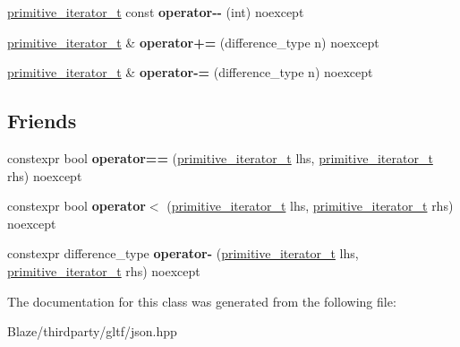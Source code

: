 \begin{DoxyCompactItemize}
\hyperlink{classnlohmann_1_1detail_1_1primitive__iterator__t}{primitive\+\_\+iterator\+\_\+t} const {\bfseries operator-\/-\/} (int) noexcept
\item 
\mbox{\label{classnlohmann_1_1detail_1_1primitive__iterator__t_aee01535df0b3b40137d9241029a9a203}} 
\hyperlink{classnlohmann_1_1detail_1_1primitive__iterator__t}{primitive\+\_\+iterator\+\_\+t} \& {\bfseries operator+=} (difference\+\_\+type n) noexcept
\item 
\mbox{\label{classnlohmann_1_1detail_1_1primitive__iterator__t_a0bf83ab08abe1ae4b51c790c85cdf151}} 
\hyperlink{classnlohmann_1_1detail_1_1primitive__iterator__t}{primitive\+\_\+iterator\+\_\+t} \& {\bfseries operator-\/=} (difference\+\_\+type n) noexcept
\end{DoxyCompactItemize}
\subsection*{Friends}
\begin{DoxyCompactItemize}
\item 
\mbox{\label{classnlohmann_1_1detail_1_1primitive__iterator__t_aae1e1e2ec0e229d1291d69de57d76bbe}} 
constexpr bool {\bfseries operator==} (\hyperlink{classnlohmann_1_1detail_1_1primitive__iterator__t}{primitive\+\_\+iterator\+\_\+t} lhs, \hyperlink{classnlohmann_1_1detail_1_1primitive__iterator__t}{primitive\+\_\+iterator\+\_\+t} rhs) noexcept
\item 
\mbox{\label{classnlohmann_1_1detail_1_1primitive__iterator__t_a901a95e6d73c9509d3dcde914f6c8a9d}} 
constexpr bool {\bfseries operator$<$} (\hyperlink{classnlohmann_1_1detail_1_1primitive__iterator__t}{primitive\+\_\+iterator\+\_\+t} lhs, \hyperlink{classnlohmann_1_1detail_1_1primitive__iterator__t}{primitive\+\_\+iterator\+\_\+t} rhs) noexcept
\item 
\mbox{\label{classnlohmann_1_1detail_1_1primitive__iterator__t_ac6d902d6ec9a02dabed5452d3ae78f7e}} 
constexpr difference\+\_\+type {\bfseries operator-\/} (\hyperlink{classnlohmann_1_1detail_1_1primitive__iterator__t}{primitive\+\_\+iterator\+\_\+t} lhs, \hyperlink{classnlohmann_1_1detail_1_1primitive__iterator__t}{primitive\+\_\+iterator\+\_\+t} rhs) noexcept
\end{DoxyCompactItemize}


The documentation for this class was generated from the following file\+:\begin{DoxyCompactItemize}
\item 
Blaze/thirdparty/gltf/json.\+hpp\end{DoxyCompactItemize}
